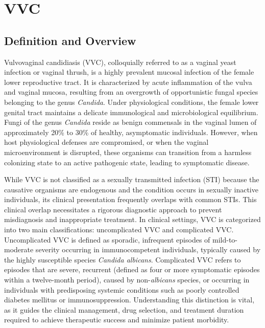 \chapter{VVC}

\section*{Definition and Overview}
Vulvovaginal candidiasis (VVC), colloquially referred to as a vaginal yeast infection or vaginal thrush, is a highly prevalent mucosal infection of the female lower reproductive tract. It is characterized by acute inflammation of the vulva and vaginal mucosa, resulting from an overgrowth of opportunistic fungal species belonging to the genus \textit{Candida}. Under physiological conditions, the female lower genital tract maintains a delicate immunological and microbiological equilibrium. Fungi of the genus \textit{Candida} reside as benign commensals in the vaginal lumen of approximately 20\% to 30\% of healthy, asymptomatic individuals. However, when host physiological defenses are compromised, or when the vaginal microenvironment is disrupted, these organisms can transition from a harmless colonizing state to an active pathogenic state, leading to symptomatic disease.

While VVC is not classified as a sexually transmitted infection (STI) because the causative organisms are endogenous and the condition occurs in sexually inactive individuals, its clinical presentation frequently overlaps with common STIs. This clinical overlap necessitates a rigorous diagnostic approach to prevent misdiagnosis and inappropriate treatment. In clinical settings, VVC is categorized into two main classifications: uncomplicated VVC and complicated VVC. Uncomplicated VVC is defined as sporadic, infrequent episodes of mild-to-moderate severity occurring in immunocompetent individuals, typically caused by the highly susceptible species \textit{Candida albicans}. Complicated VVC refers to episodes that are severe, recurrent (defined as four or more symptomatic episodes within a twelve-month period), caused by non-\textit{albicans} species, or occurring in individuals with predisposing systemic conditions such as poorly controlled diabetes mellitus or immunosuppression. Understanding this distinction is vital, as it guides the clinical management, drug selection, and treatment duration required to achieve therapeutic success and minimize patient morbidity.

